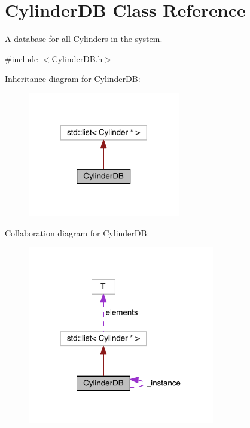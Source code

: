 \hypertarget{classCylinderDB}{\section{Cylinder\+D\+B Class Reference}
\label{classCylinderDB}
}


A database for all \hyperlink{classCylinder}{Cylinders} in the system.  




{\ttfamily \#include $<$Cylinder\+D\+B.\+h$>$}



Inheritance diagram for Cylinder\+D\+B\+:\nopagebreak
\begin{figure}[H]
\begin{center}
\leavevmode
\includegraphics[width=188pt]{classCylinderDB__inherit__graph}
\end{center}
\end{figure}


Collaboration diagram for Cylinder\+D\+B\+:\nopagebreak
\begin{figure}[H]
\begin{center}
\leavevmode
\includegraphics[width=231pt]{classCylinderDB__coll__graph}
\end{center}
\end{figure}
